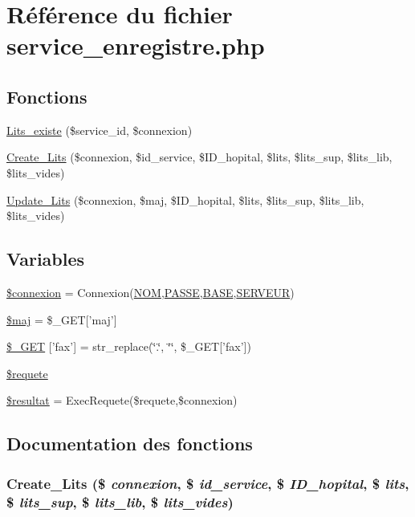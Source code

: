 \hypertarget{service__enregistre_8php}{
\section{R\'{e}f\'{e}rence du fichier service\_\-enregistre.php}
\label{service__enregistre_8php}
}
\subsection*{Fonctions}
\begin{CompactItemize}
\item 
\hyperlink{service__enregistre_8php_a5}{Lits\_\-existe} (\$service\_\-id, \$connexion)
\item 
\hyperlink{service__enregistre_8php_a6}{Create\_\-Lits} (\$connexion, \$id\_\-service, \$ID\_\-hopital, \$lits, \$lits\_\-sup, \$lits\_\-lib, \$lits\_\-vides)
\item 
\hyperlink{service__enregistre_8php_a7}{Update\_\-Lits} (\$connexion, \$maj, \$ID\_\-hopital, \$lits, \$lits\_\-sup, \$lits\_\-lib, \$lits\_\-vides)
\end{CompactItemize}
\subsection*{Variables}
\begin{CompactItemize}
\item 
\hyperlink{service__enregistre_8php_a0}{\$connexion} = Connexion(\hyperlink{pma__connect_8php_a0}{NOM},\hyperlink{pma__connect_8php_a1}{PASSE},\hyperlink{pma__connect_8php_a3}{BASE},\hyperlink{pma__connect_8php_a2}{SERVEUR})
\item 
\hyperlink{service__enregistre_8php_a1}{\$maj} = \$\_\-GET\mbox{[}'maj'\mbox{]}
\item 
\hyperlink{service__enregistre_8php_a2}{\$\_\-GET} \mbox{[}'fax'\mbox{]} = str\_\-replace(\char`\"{}.\char`\"{}, \char`\"{}\char`\"{}, \$\_\-GET\mbox{[}'fax'\mbox{]})
\item 
\hyperlink{service__enregistre_8php_a3}{\$requete}
\item 
\hyperlink{service__enregistre_8php_a4}{\$resultat} = Exec\-Requete(\$requete,\$connexion)
\end{CompactItemize}


\subsection{Documentation des fonctions}
\hypertarget{service__enregistre_8php_a6}{
\subsubsection[Create\_\-Lits]{\setlength{\rightskip}{0pt plus 5cm}Create\_\-Lits (\$ {\em connexion}, \$ {\em id\_\-service}, \$ {\em ID\_\-hopital}, \$ {\em lits}, \$ {\em lits\_\-sup}, \$ {\em lits\_\-lib}, \$ {\em lits\_\-vides})}}
\label{service__enregistre_8php_a6}


